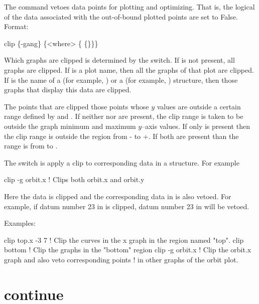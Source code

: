 The  command vetoes data points for plotting and optimizing. That is, the
 logical of the data associated with the out-of-bound plotted points are set
to False.  Format:
\begin{example}
  clip \{-gang\} \{<where> \{<limit1> \{<limit2>\}\}\}
\end{example}

\vskip 10pt 

Which graphs are clipped is determined by the  switch. If  is not
present, all graphs are clipped. If  is a plot name, then all the graphs of that
plot are clipped. If  is the name of a  (for example, ) or
a  (for example, ) structure, then those graphs that display this
data are clipped.

The points that are clipped those points whose $y$ values are outside a certain range
defined by  and . If neither  nor  are
present, the clip range is taken to be outside the graph minimum and maximum $y$--axis
values. If only  is present then the clip range is outside the region from
- to +. If both are present than the range is from 
to .

The  switch is apply a clip to corresponding data in a  structure.
For example
\begin{example}
  clip -g orbit.x   ! Clips both orbit.x and orbit.y 
\end{example}
Here the  data is clipped and the corresponding data in  is also
vetoed. For example, if datum number 23 in  is clipped, datum number 23 in
 will be vetoed.

Examples:
\begin{example}
  clip top.x -3  7  ! Clip the curves in the x graph in the region named "top".
  clip bottom       ! Clip the graphs in the "bottom" region
  clip -g orbit.x   ! Clip the orbit.x graph and also veto corresponding points
                    ! in other graphs of the orbit plot.
\end{example}

\section{continue}
\label{s:continue}

